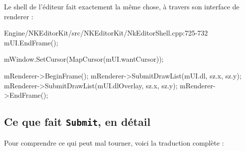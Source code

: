 Le shell de l'éditeur fait exactement la même chose, à travers son interface de
renderer :

\begin{nkcode}{Engine/NKEditorKit/src/NKEditorKit/NkEditorShell.cpp:725-732}
mUI.EndFrame();

mWindow.SetCursor(MapCursor(mUI.wantCursor));

mRenderer->BeginFrame();
mRenderer->SubmitDrawList(mUI.dl, sz.x, sz.y);
mRenderer->SubmitDrawList(mUI.dlOverlay, sz.x, sz.y);
mRenderer->EndFrame();
\end{nkcode}

\subsection{Ce que fait \texttt{Submit}, en détail}

Pour comprendre ce qui peut mal tourner, voici la traduction complète :

